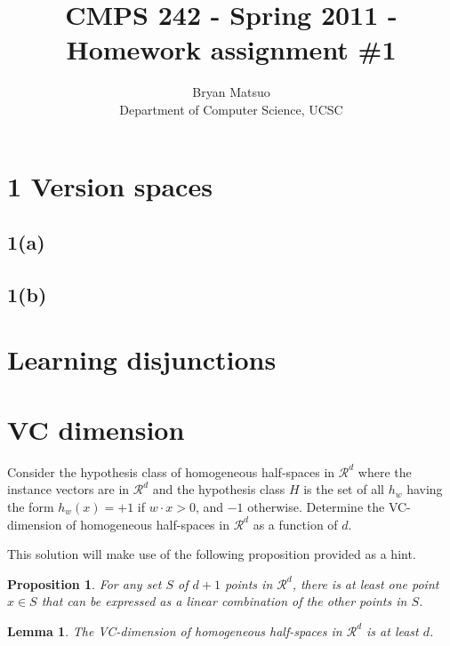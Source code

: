 \documentclass[11pt]{article}
\newtheorem{lemma}{Lemma}[section]
\newtheorem{proposition}{Proposition}[section]
\begin{document}
\title{CMPS 242 - Spring 2011 - Homework assignment \#1}
\author{ {Bryan Matsuo}\\
{Department of Computer Science, UCSC}}
\maketitle

\section*{1 Version spaces}
\subsection*{1(a)}
\subsection*{1(b)}

\section{Learning disjunctions}



\section{VC dimension}

Consider the hypothesis class of homogeneous half-spaces in $\mathcal{R}^d$ where the instance vectors are in $\mathcal{R}^d$ and the hypothesis class $H$ is the set of all $h_w$ having the form $h_w(x) = +1$ if $w \cdot x > 0$, and $-1$ otherwise.
Determine the VC-dimension of homogeneous half-spaces in $\mathcal{R}^d$ as a function of $d$.

This solution will make use of the following proposition provided as a hint.
\begin{proposition}
    \label{prop:lin-comb}
    For any set $S$ of $d+1$ points in $\mathcal{R}^d$, there is at least one point $x \in S$ that can be expressed as a linear combination of the other points in $S$.
\end{proposition}

\begin{lemma}
    The VC-dimension of homogeneous half-spaces in $\mathcal{R}^d$ is at least $d$.
\end{lemma}
\end{document}
